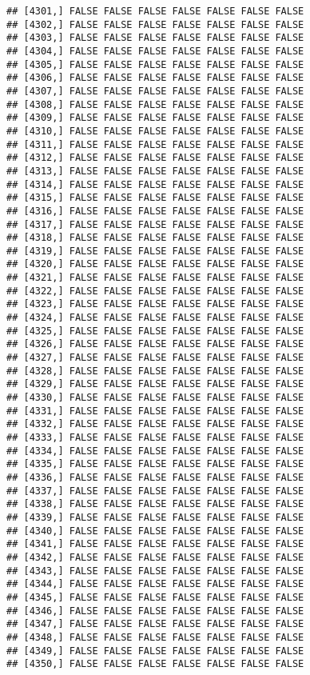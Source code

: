 \documentclass[
]{article}
\begin{document}
\begin{verbatim}
## [4301,] FALSE FALSE FALSE FALSE FALSE FALSE FALSE
## [4302,] FALSE FALSE FALSE FALSE FALSE FALSE FALSE
## [4303,] FALSE FALSE FALSE FALSE FALSE FALSE FALSE
## [4304,] FALSE FALSE FALSE FALSE FALSE FALSE FALSE
## [4305,] FALSE FALSE FALSE FALSE FALSE FALSE FALSE
## [4306,] FALSE FALSE FALSE FALSE FALSE FALSE FALSE
## [4307,] FALSE FALSE FALSE FALSE FALSE FALSE FALSE
## [4308,] FALSE FALSE FALSE FALSE FALSE FALSE FALSE
## [4309,] FALSE FALSE FALSE FALSE FALSE FALSE FALSE
## [4310,] FALSE FALSE FALSE FALSE FALSE FALSE FALSE
## [4311,] FALSE FALSE FALSE FALSE FALSE FALSE FALSE
## [4312,] FALSE FALSE FALSE FALSE FALSE FALSE FALSE
## [4313,] FALSE FALSE FALSE FALSE FALSE FALSE FALSE
## [4314,] FALSE FALSE FALSE FALSE FALSE FALSE FALSE
## [4315,] FALSE FALSE FALSE FALSE FALSE FALSE FALSE
## [4316,] FALSE FALSE FALSE FALSE FALSE FALSE FALSE
## [4317,] FALSE FALSE FALSE FALSE FALSE FALSE FALSE
## [4318,] FALSE FALSE FALSE FALSE FALSE FALSE FALSE
## [4319,] FALSE FALSE FALSE FALSE FALSE FALSE FALSE
## [4320,] FALSE FALSE FALSE FALSE FALSE FALSE FALSE
## [4321,] FALSE FALSE FALSE FALSE FALSE FALSE FALSE
## [4322,] FALSE FALSE FALSE FALSE FALSE FALSE FALSE
## [4323,] FALSE FALSE FALSE FALSE FALSE FALSE FALSE
## [4324,] FALSE FALSE FALSE FALSE FALSE FALSE FALSE
## [4325,] FALSE FALSE FALSE FALSE FALSE FALSE FALSE
## [4326,] FALSE FALSE FALSE FALSE FALSE FALSE FALSE
## [4327,] FALSE FALSE FALSE FALSE FALSE FALSE FALSE
## [4328,] FALSE FALSE FALSE FALSE FALSE FALSE FALSE
## [4329,] FALSE FALSE FALSE FALSE FALSE FALSE FALSE
## [4330,] FALSE FALSE FALSE FALSE FALSE FALSE FALSE
## [4331,] FALSE FALSE FALSE FALSE FALSE FALSE FALSE
## [4332,] FALSE FALSE FALSE FALSE FALSE FALSE FALSE
## [4333,] FALSE FALSE FALSE FALSE FALSE FALSE FALSE
## [4334,] FALSE FALSE FALSE FALSE FALSE FALSE FALSE
## [4335,] FALSE FALSE FALSE FALSE FALSE FALSE FALSE
## [4336,] FALSE FALSE FALSE FALSE FALSE FALSE FALSE
## [4337,] FALSE FALSE FALSE FALSE FALSE FALSE FALSE
## [4338,] FALSE FALSE FALSE FALSE FALSE FALSE FALSE
## [4339,] FALSE FALSE FALSE FALSE FALSE FALSE FALSE
## [4340,] FALSE FALSE FALSE FALSE FALSE FALSE FALSE
## [4341,] FALSE FALSE FALSE FALSE FALSE FALSE FALSE
## [4342,] FALSE FALSE FALSE FALSE FALSE FALSE FALSE
## [4343,] FALSE FALSE FALSE FALSE FALSE FALSE FALSE
## [4344,] FALSE FALSE FALSE FALSE FALSE FALSE FALSE
## [4345,] FALSE FALSE FALSE FALSE FALSE FALSE FALSE
## [4346,] FALSE FALSE FALSE FALSE FALSE FALSE FALSE
## [4347,] FALSE FALSE FALSE FALSE FALSE FALSE FALSE
## [4348,] FALSE FALSE FALSE FALSE FALSE FALSE FALSE
## [4349,] FALSE FALSE FALSE FALSE FALSE FALSE FALSE
## [4350,] FALSE FALSE FALSE FALSE FALSE FALSE FALSE

\end{verbatim}
\end{document}
